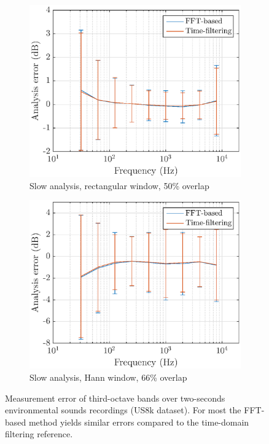 \documentclass[sensors,article,accept,moreauthors,pdftex,10pt,a4paper]{mdpi}
\begin{document}
\begin{figure}[H]
	\begin{subfigure}[H]{0.47\textwidth}
        \centering
        \includegraphics[width=1\textwidth]{figures/err_m_u_s_r.eps}
        \caption{Slow analysis, rectangular window, 50\% overlap}
    \end{subfigure}
    \begin{subfigure}[H]{0.475\textwidth}
        \centering
        \includegraphics[width=1\textwidth]{figures/err_m_u_s_h.eps}
        \caption{Slow analysis, Hann window, 66\% overlap}
    \end{subfigure}
    \vspace{-10pt}
    \caption{Measurement error of third-octave bands over two-seconds environmental sounds recordings (US8k dataset). For most  the FFT-based method yields similar errors compared to the time-domain filtering reference. \label{fig:errormu}}
\end{figure}
\end{document}
